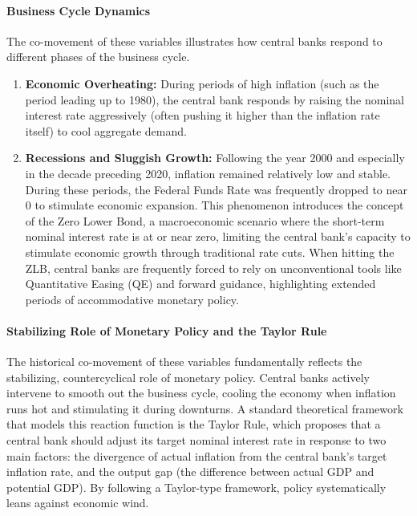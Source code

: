 \documentclass[dvipsnames,11pt]{article}
\begin{document}
\begin{enumerate}
\begin{solution}
                    \paragraph*{Business Cycle Dynamics}
                    The co-movement of these variables illustrates how central banks respond to different phases of the business cycle.
                    \begin{enumerate}
                        \item \textbf{Economic Overheating:} During periods of high inflation (such as the period leading up to 1980), the central bank responds by raising the nominal interest rate aggressively (often pushing it higher than the inflation rate itself) to cool aggregate demand.
                        \item \textbf{Recessions and Sluggish Growth:} Following the year 2000 and especially in the decade preceding 2020, inflation remained relatively low and stable. During these periods, the Federal Funds Rate was frequently dropped to near $0$ to stimulate economic expansion. This phenomenon introduces the concept of the Zero Lower Bond, a macroeconomic scenario where the short-term nominal interest rate is at or near zero, limiting the central bank's capacity to stimulate economic growth through traditional rate cuts. When hitting the ZLB, central banks are frequently forced to rely on unconventional tools like Quantitative Easing (QE) and forward guidance, highlighting extended periods of accommodative monetary policy.
                    \end{enumerate} 
                    
                    \paragraph*{Stabilizing Role of Monetary Policy and the Taylor Rule}
                    The historical co-movement of these variables fundamentally reflects the stabilizing, countercyclical role of monetary policy. Central banks actively intervene to smooth out the business cycle, cooling the economy when inflation runs hot and stimulating it during downturns. A standard theoretical framework that models this reaction function is the Taylor Rule, which proposes that a central bank should adjust its target nominal interest rate in response to two main factors: the divergence of actual inflation from the central bank's target inflation rate, and the output gap (the difference between actual GDP and potential GDP). By following a Taylor-type framework, policy systematically leans against economic wind. 
                    

\end{solution}
\end{enumerate}
\end{document}
